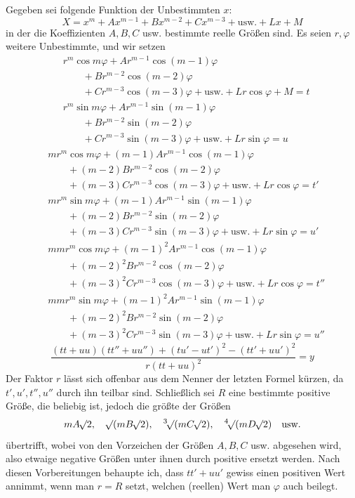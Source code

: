 Gegeben sei folgende Funktion der Unbestimmten $x$:
\[
X=x^m+Ax^{m-1}+Bx^{m-2}+Cx^{m-3}+\text{usw.}+Lx+M
\]
in der die Koeffizienten $A,B,C$ usw. bestimmte reelle Größen sind. Es seien $r,\varphi$ weitere Unbestimmte, und wir setzen
\[
\begin{aligned}
&r^m\cos m\varphi+Ar^{m-1}\cos(m-1)\varphi\\
&\qquad+Br^{m-2}\cos(m-2)\varphi\\
&\qquad+Cr^{m-3}\cos(m-3)\varphi+\text{usw.}+Lr\cos\varphi+M=t\\
&r^m\sin m\varphi+Ar^{m-1}\sin(m-1)\varphi\\
&\qquad+Br^{m-2}\sin(m-2)\varphi\\
&\qquad+Cr^{m-3}\sin(m-3)\varphi+\text{usw.}+Lr\sin\varphi=u
\end{aligned}
\]
\[
\begin{aligned}
&mr^m\cos m\varphi+(m-1)Ar^{m-1}\cos(m-1)\varphi\\
&\qquad+(m-2)Br^{m-2}\cos(m-2)\varphi\\
&\qquad+(m-3)Cr^{m-3}\cos(m-3)\varphi+\text{usw.}+Lr\cos\varphi=t'\\
&mr^m\sin m\varphi+(m-1)Ar^{m-1}\sin(m-1)\varphi\\
&\qquad+(m-2)Br^{m-2}\sin(m-2)\varphi\\
&\qquad+(m-3)Cr^{m-3}\sin(m-3)\varphi+\text{usw.}+Lr\sin\varphi=u'\\[6pt]
&mmr^m\cos m\varphi+(m-1)^2Ar^{m-1}\cos(m-1)\varphi\\
&\qquad+(m-2)^2Br^{m-2}\cos(m-2)\varphi\\
&\qquad+(m-3)^2Cr^{m-3}\cos(m-3)\varphi+\text{usw.}+Lr\cos\varphi=t''\\
&mmr^m\sin m\varphi+(m-1)^2Ar^{m-1}\sin(m-1)\varphi\\
&\qquad+(m-2)^2Br^{m-2}\sin(m-2)\varphi\\
&\qquad+(m-3)^2Cr^{m-3}\sin(m-3)\varphi+\text{usw.}+Lr\sin\varphi=u''
\end{aligned}
\]
\[
\frac{(tt+uu)(tt''+uu'')+(tu'-ut')^2-(tt'+uu')^2}{r(tt+uu)^2}=y
\]
Der Faktor $r$ lässt sich offenbar aus dem Nenner der letzten Formel kürzen, da $t',u',t'',u''$ durch ihn teilbar sind. Schließlich sei $R$ eine bestimmte positive Größe, die beliebig ist, jedoch die größte der Größen
\[
mA\BareRoot{2},\quad\BareRoot{(mB\BareRoot{2})},\quad\BareRoot[3]{(mC\BareRoot{2})},\quad\BareRoot[4]{(mD\BareRoot{2})}\quad\text{usw.}
\]
übertrifft, wobei von den Vorzeichen der Größen $A,B,C$ usw. abgesehen wird, also etwaige negative Größen unter ihnen durch positive ersetzt werden. Nach diesen Vorbereitungen behaupte ich, dass $tt'+uu'$ gewiss einen positiven Wert annimmt, wenn man $r=R$ setzt, welchen (reellen) Wert man $\varphi$ auch beilegt.

